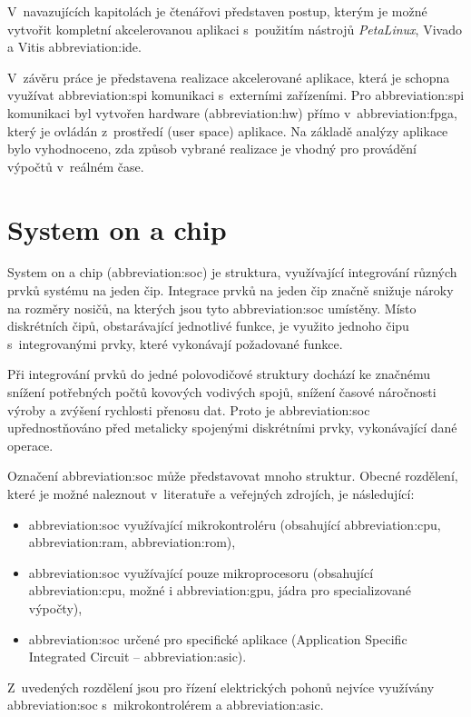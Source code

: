 \documentclass[a4paper, twoside, 11pt]{article}
\begin{document}
V~navazujících kapitolách je čtenářovi představen postup, kterým je možné vytvořit kompletní akcelerovanou aplikaci s~použitím nástrojů \textit{PetaLinux}, Vivado a Vitis \gls{abbreviation:ide}.\par
V~závěru práce je představena realizace akcelerované aplikace, která je schopna využívat \gls{abbreviation:spi} komunikaci s~externími zařízeními. Pro \gls{abbreviation:spi} komunikaci byl vytvořen hardware (\gls{abbreviation:hw}) přímo v~\gls{abbreviation:fpga}, který je ovládán z~prostředí (user space) aplikace. Na základě analýzy aplikace bylo vyhodnoceno, zda způsob vybrané realizace je vhodný pro provádění výpočtů v~reálném čase.

\flushbottom %
\newpage

\section{System on a chip}\label{sec:system-on-a-chip}
	System on a chip (\gls{abbreviation:soc}) je struktura, využívající integrování různých prvků systému na jeden čip. Integrace prvků na jeden čip značně snižuje nároky na rozměry nosičů, na kterých jsou tyto \gls{abbreviation:soc} umístěny. Místo diskrétních čipů, obstarávající jednotlivé funkce, je využito jednoho čipu s~integrovanými prvky, které vykonávají požadované funkce.\par
	Při integrování prvků do jedné polovodičové struktury dochází ke značnému snížení potřebných počtů kovových vodivých spojů, snížení časové náročnosti výroby a zvýšení rychlosti přenosu dat. Proto je \gls{abbreviation:soc} upřednostňováno před metalicky spojenými diskrétními prvky, vykonávající dané operace.\par
	Označení \gls{abbreviation:soc} může představovat mnoho struktur. Obecné rozdělení, které je možné naleznout v~literatuře a veřejných zdrojích, je následující:
	\begin{itemize}
		\item \gls{abbreviation:soc} využívající mikrokontroléru (obsahující \gls{abbreviation:cpu}, \gls{abbreviation:ram}, \gls{abbreviation:rom}),
		\item \gls{abbreviation:soc} využívající pouze mikroprocesoru (obsahující \gls{abbreviation:cpu}, možné i \gls{abbreviation:gpu}, jádra pro specializované výpočty),
		\item \gls{abbreviation:soc} určené pro specifické aplikace (Application Specific Integrated Circuit – \gls{abbreviation:asic}).
	\end{itemize}\cite{tomshardware-system-on-chip}\par
	Z~uvedených rozdělení jsou pro řízení elektrických pohonů nejvíce využívány \gls{abbreviation:soc} s~mikrokontrolérem a \gls{abbreviation:asic}.
\end{document}
